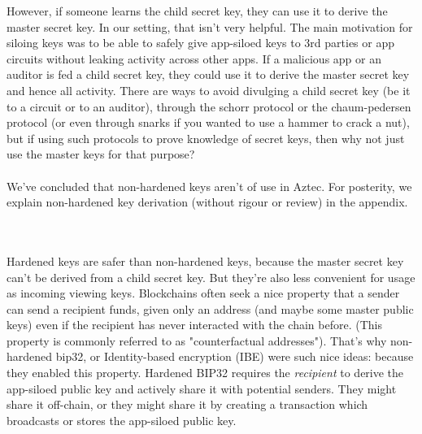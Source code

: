 However, if someone learns the child secret key, they can use it to derive the master secret key.
In our setting, that isn't very helpful.
The main motivation for siloing keys was to be able to safely give app-siloed keys to 3rd parties or app circuits without leaking activity across other apps.
If a malicious app or an auditor is fed a child secret key, they could use it to derive the master secret key and hence all activity.
There are ways to avoid divulging a child secret key (be it to a circuit or to an auditor), through the schorr protocol or the chaum-pedersen protocol (or even through snarks if you wanted to use a hammer to crack a nut), but if using such protocols to prove knowledge of secret keys, then why not just use the master keys for that purpose?\\
\\
We've concluded that non-hardened keys aren't of use in Aztec.
For posterity, we explain non-hardened key derivation (without rigour or review) in the appendix.





\hfill\\
\\
Hardened keys are safer than non-hardened keys, because the master secret key can't be derived from a child secret key.
But they're also less convenient for usage as incoming viewing keys.
Blockchains often seek a nice property that a sender can send a recipient funds, given only an address (and maybe some master public keys) even if the recipient has never interacted with the chain before. (This property is commonly referred to as "counterfactual addresses").
That's why non-hardened bip32, or Identity-based encryption (IBE) were such nice ideas: because they enabled this property.
Hardened BIP32 requires the \textit{recipient} to derive the app-siloed public key and actively share it with potential senders.
They might share it off-chain, or they might share it by creating a transaction which broadcasts or stores the app-siloed public key.

